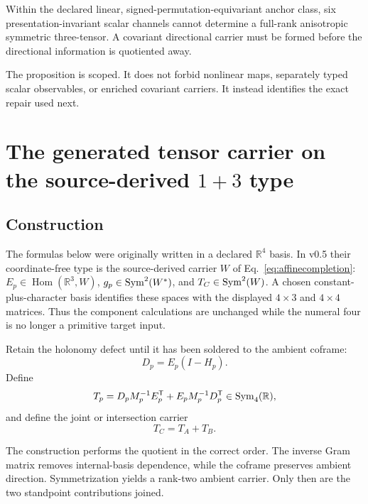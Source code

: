 \begin{proposition}\label{prop:nogo}
Within the declared linear, signed-permutation-equivariant anchor class, six presentation-invariant scalar channels cannot determine a full-rank anisotropic symmetric three-tensor. A covariant directional carrier must be formed before the directional information is quotiented away.
\end{proposition}

The proposition is scoped. It does not forbid nonlinear maps, separately typed scalar observables, or enriched covariant carriers. It instead identifies the exact repair used next.

\section{The generated tensor carrier on the source-derived $1+3$ type}

\subsection{Construction}

The formulas below were originally written in a declared $\mathbb R^4$ basis. In v0.5 their coordinate-free type is the source-derived carrier $W$ of Eq.~\eqref{eq:affinecompletion}: $E_p\in\operatorname{Hom}(\mathbb R^3,W)$, $g_p\in\operatorname{Sym}^2(W^*)$, and $T_C\in\operatorname{Sym}^2(W)$. A chosen constant-plus-character basis identifies these spaces with the displayed $4\times3$ and $4\times4$ matrices. Thus the component calculations are unchanged while the numeral four is no longer a primitive target input.

Retain the holonomy defect until it has been soldered to the ambient coframe:
\begin{equation}\label{eq:defect}
 D_p=E_p(I-H_p).
\end{equation}
Define
\begin{equation}\label{eq:Tp}
 T_p=D_pM_p^{-1}E_p^{\mathsf T}
     +E_pM_p^{-1}D_p^{\mathsf T}\in\operatorname{Sym}_4(\mathbb R),
\end{equation}
and define the joint or intersection carrier
\begin{equation}\label{eq:Tjoint}
 T_C=T_A+T_B.
\end{equation}

The construction performs the quotient in the correct order. The inverse Gram matrix removes internal-basis dependence, while the coframe preserves ambient direction. Symmetrization yields a rank-two ambient carrier. Only then are the two standpoint contributions joined.


